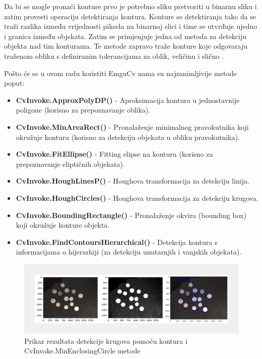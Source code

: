 \documentclass{foi}
\begin{document}
Da bi se mogle pronaći konture prvo je potrebno sliku pretvoriti u binarnu sliku i zatim provesti operaciju detektiranja kontura. Konture se detektiranja tako da se traži razlika između vrijednosti piksela na binarnoj slici i time se utvrđuje ujedno i granica između objekata. Zatim se primjenjuje jedna od metoda za detekciju objekta nad tim konturama. Te metode zapravo traže konture koje odgovaraju traženom obliku s definiranim tolerancijama za oblik, veličinu i slično \cite{konturesShapes}.

\begin{flushleft}
    Pošto će se u ovom radu koristiti EmguCv nama su najzanimljivije metode poput:
    \begin{itemize}
        \item \textbf{CvInvoke.ApproxPolyDP()} - Aproksimacija kontura u jednostavnije poligone (korisno za prepoznavanje oblika).
        \item \textbf{CvInvoke.MinAreaRect()} - Pronalaženje minimalnog pravokutnika koji okružuje konturu (korisno za detekciju objekata u obliku pravokutnika).
        \item \textbf{CvInvoke.FitEllipse()} - Fitting elipse na konturu (korisno za prepoznavanje eliptičnih objekata).
        \item \textbf{CvInvoke.HoughLinesP()} - Houghova transformacija za detekciju linija.
        \item \textbf{CvInvoke.HoughCircles()} - Houghova transformacija za detekciju krugova.
        \item \textbf{CvInvoke.BoundingRectangle()} - Pronalaženje okvira (bounding box) koji okružuje konture objekta.
        \item \textbf{CvInvoke.FindContoursHierarchical()} - Detekcija kontura s informacijama o hijerarhiji (za detekciju unutarnjih i vanjskih objekata).
    \end{itemize}
\end{flushleft}

\begin{figure}[H]
    \centering
    \includegraphics[width=1.0\linewidth]{slike/shapeDetection.png}
    \caption{\centering Prikaz rezultata detekcije krugova pomoću kontura i CvInvoke.MinEnclosingCircle metode \cite{segvsdetection_2}}
\end{figure}
\end{document}
